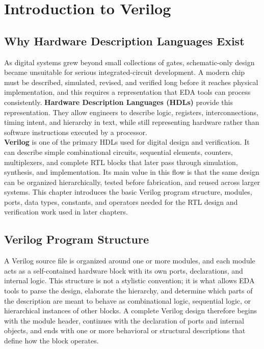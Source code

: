 \chapter{Introduction to Verilog}

\section{Why Hardware Description Languages Exist}

As digital systems grew beyond small collections of gates, schematic-only design became unsuitable
for serious integrated-circuit development. A modern chip must be described, simulated, revised, and
verified long before it reaches physical implementation, and this requires a representation that EDA
tools can process consistently. \textbf{Hardware Description Languages (HDLs)} provide this
representation. They allow engineers to describe logic, registers, interconnections, timing intent,
and hierarchy in text, while still representing hardware rather than software instructions executed
by a processor.\\

\noindent \textbf{Verilog} is one of the primary HDLs used for digital design and verification. It can
describe simple combinational circuits, sequential elements, counters, multiplexers, and complete
RTL blocks that later pass through simulation, synthesis, and implementation. Its main value in this
flow is that the same design can be organized hierarchically, tested before fabrication, and reused
across larger systems. This chapter introduces the basic Verilog program structure, modules, ports,
data types, constants, and operators needed for the RTL design and verification work used in later
chapters.\\


\section{Verilog Program Structure}

A Verilog source file is organized around one or more modules, and each module acts as a self-contained
hardware block with its own ports, declarations, and internal logic. This structure is not a stylistic
convention; it is what allows EDA tools to parse the design, elaborate the hierarchy, and determine
which parts of the description are meant to behave as combinational logic, sequential logic, or
hierarchical instances of other blocks. A complete Verilog design therefore begins with the module
header, continues with the declaration of ports and internal objects, and ends with one or more
behavioral or structural descriptions that define how the block operates.\\


